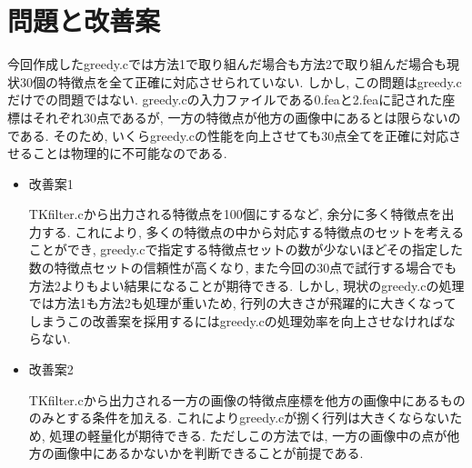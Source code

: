 \documentclass[a4j]{jarticle}
\begin{document}
\section{問題と改善案}
今回作成したgreedy.cでは方法1で取り組んだ場合も方法2で取り組んだ場合も現状30個の特徴点を全て正確に対応させられていない.
しかし, この問題はgreedy.cだけでの問題ではない. greedy.cの入力ファイルである0.feaと2.feaに記された座標はそれぞれ30点であるが, 一方の特徴点が他方の画像中にあるとは限らないのである. そのため, いくらgreedy.cの性能を向上させても30点全てを正確に対応させることは物理的に不可能なのである. 

\begin{itemize}
\item{改善案1}

TKfilter.cから出力される特徴点を100個にするなど, 余分に多く特徴点を出力する. 
これにより, 多くの特徴点の中から対応する特徴点のセットを考えることができ, greedy.cで指定する特徴点セットの数が少ないほどその指定した数の特徴点セットの信頼性が高くなり, また今回の30点で試行する場合でも方法2よりもよい結果になることが期待できる. 
しかし, 現状のgreedy.cの処理では方法1も方法2も処理が重いため, 行列の大きさが飛躍的に大きくなってしまうこの改善案を採用するにはgreedy.cの処理効率を向上させなければならない.

\item{改善案2}

TKfilter.cから出力される一方の画像の特徴点座標を他方の画像中にあるもののみとする条件を加える. 
これによりgreedy.cが捌く行列は大きくならないため, 処理の軽量化が期待できる. 
ただしこの方法では, 一方の画像中の点が他方の画像中にあるかないかを判断できることが前提である. 

\end{itemize}
\end{document}
